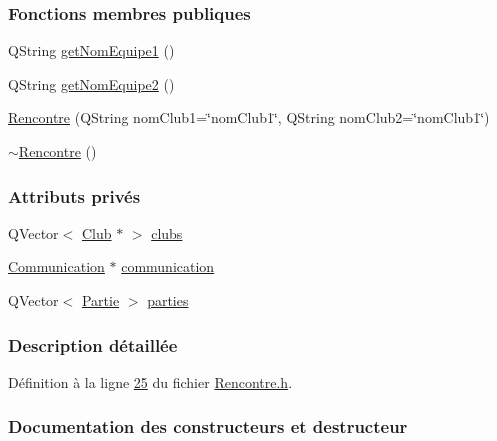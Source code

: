 \subsubsection*{Fonctions membres publiques}
\begin{DoxyCompactItemize}
\item 
Q\+String \hyperlink{class_rencontre_a50df24caf57437d8eaaadae43ff846ec}{get\+Nom\+Equipe1} ()
\item 
Q\+String \hyperlink{class_rencontre_ac544f97755480e0e2718d0802d308585}{get\+Nom\+Equipe2} ()
\item 
\hyperlink{class_rencontre_aab1bbf3ea211e00186ab7f866994b77a}{Rencontre} (Q\+String nom\+Club1=\char`\"{}nom\+Club1\char`\"{}, Q\+String nom\+Club2=\char`\"{}nom\+Club1\char`\"{})
\item 
\hyperlink{class_rencontre_a437de7d5f9adced5124dcfdd13e504d3}{$\sim$\+Rencontre} ()
\end{DoxyCompactItemize}
\subsubsection*{Attributs privés}
\begin{DoxyCompactItemize}
\item 
Q\+Vector$<$ \hyperlink{class_club}{Club} $\ast$ $>$ \hyperlink{class_rencontre_a12f6cef62070ecb095971e704a9d92a6}{clubs}
\item 
\hyperlink{class_communication}{Communication} $\ast$ \hyperlink{class_rencontre_a843a1b93c1cb909f2706c6f81438661e}{communication}
\item 
Q\+Vector$<$ \hyperlink{class_partie}{Partie} $>$ \hyperlink{class_rencontre_a6b52ccf9b5d083718928b207ae5316fe}{parties}
\end{DoxyCompactItemize}


\subsubsection{Description détaillée}


Définition à la ligne \hyperlink{_rencontre_8h_source_l00025}{25} du fichier \hyperlink{_rencontre_8h_source}{Rencontre.\+h}.



\subsubsection{Documentation des constructeurs et destructeur}
\mbox{\label{class_rencontre_aab1bbf3ea211e00186ab7f866994b77a}} 
